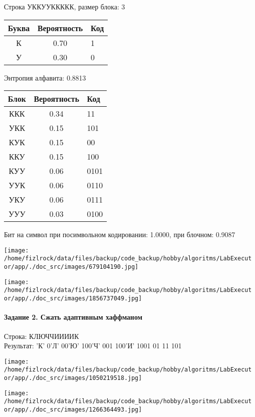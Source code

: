 \documentclass[a4paper, 12pt]{article}
\begin{document}
Строка УККУУККККК, размер блока: 3
\begin{center}
 \begin{tabular}{ |c|c|l| } 
  \hline
     Буква & Вероятность & Код\\ \hline
К & 0.70 & 1\\\hline
У & 0.30 & 0
\\ \hline \end{tabular}
\end{center}
Энтропия алфавита: 0.8813
\begin{center}
 \begin{tabular}{ |c|c|l| } 
  \hline
     Блок & Вероятность & Код\\ \hline
ККК & 0.34 & 11\\\hline
УКК & 0.15 & 101\\\hline
КУК & 0.15 & 00\\\hline
ККУ & 0.15 & 100\\\hline
КУУ & 0.06 & 0101\\\hline
УУК & 0.06 & 0110\\\hline
УКУ & 0.06 & 0111\\\hline
УУУ & 0.03 & 0100
\\ \hline \end{tabular}
\end{center}
Бит на символ при посимвольном кодировании: 1.0000, при блочном: 0.9087

\texttt{[image: /home/fizlrock/data/files/backup/code\_backup/hobby/algoritms/LabExecutor/app/./doc\_src/images/679104190.jpg]}

\texttt{[image: /home/fizlrock/data/files/backup/code\_backup/hobby/algoritms/LabExecutor/app/./doc\_src/images/1856737049.jpg]}
\pagebreak
\paragraph{Задание 2. Сжать адаптивным хаффманом\\}

Строка: 
КЛЮЧЧИИИИК\\
Результат: 'К' 0'Л' 00'Ю' 100'Ч' 001 100'И' 1001 01 11 101

\texttt{[image: /home/fizlrock/data/files/backup/code\_backup/hobby/algoritms/LabExecutor/app/./doc\_src/images/1050219518.jpg]}

\texttt{[image: /home/fizlrock/data/files/backup/code\_backup/hobby/algoritms/LabExecutor/app/./doc\_src/images/1266364493.jpg]}
\end{document}
